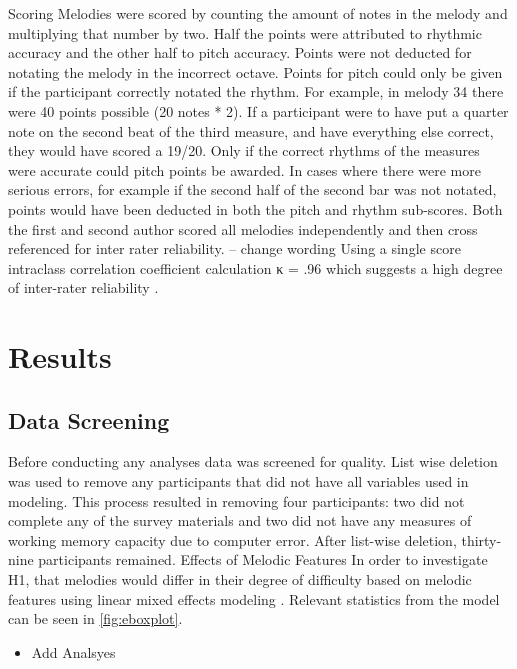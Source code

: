 \documentclass[]{book}
\providecommand{\tightlist}{%
  \setlength{\itemsep}{0pt}\setlength{\parskip}{0pt}}
\begin{document}
Scoring Melodies were scored by counting the amount of notes in the melody and multiplying that number by two.
Half the points were attributed to rhythmic accuracy and the other
half to pitch accuracy.
Points were not deducted for notating the melody in the incorrect octave.
Points for pitch could only be given if the participant correctly notated the rhythm.
For example, in melody 34 there were 40 points possible (20 notes * 2).
If a participant were to have put a quarter note on the second beat of the third measure, and have everything else correct, they would have scored a 19/20.
Only if the correct rhythms of the measures were accurate could pitch points be
awarded.
In cases where there were more serious errors, for example if the second half of the second bar was not notated, points would have been deducted in both the pitch and rhythm sub-scores.
Both the first and second author scored all melodies independently and then cross referenced for inter rater
reliability. -- change wording
Using a single score intraclass correlation coefficient calculation κ = .96 which suggests a high degree of inter-rater reliability \citep{kooGuidelineSelectingReporting2016}.

\hypertarget{results-1}{%
\section{Results}\label{results-1}}

\hypertarget{data-screening}{%
\subsection{Data Screening}\label{data-screening}}

Before conducting any analyses data was screened for quality.
List wise deletion was used to remove any participants that did not have all variables used in modeling.
This process resulted in removing four participants: two did not complete any of the survey materials and two did not have any measures of working memory capacity due to computer error.
After list-wise deletion, thirty-nine participants remained.
Effects of Melodic Features In order to investigate H1, that melodies would differ in their degree of difficulty based on melodic features using linear mixed effects modeling \citep{batesFittingLinearMixedEffects2015}.
Relevant statistics from the model can be seen in \ref{fig:eboxplot}.

\begin{itemize}
\tightlist
\item
  Add Analsyes
\end{itemize}
\end{document}
